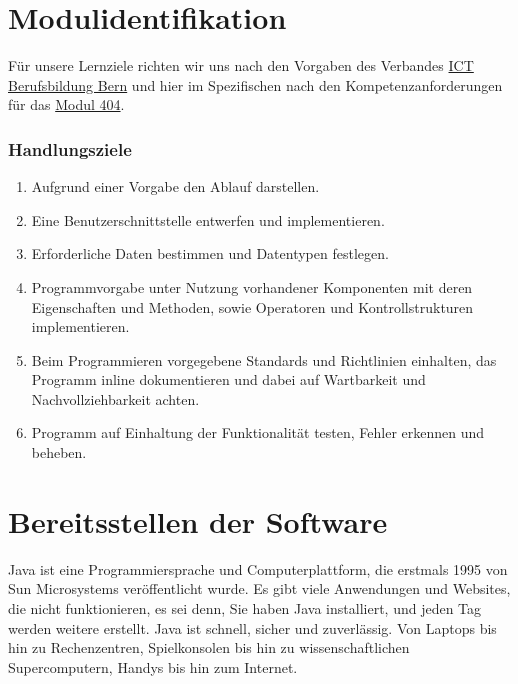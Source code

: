 \mode*




\section{Modulidentifikation}
\label{sec:identification}

Für unsere Lernziele richten wir uns nach den Vorgaben des Verbandes
\href{https://ict-berufsbildung-bern.ch}{ICT Berufsbildung Bern} und hier im Spezifischen
nach den Kompetenzanforderungen für das
\href{https://cf.ict-berufsbildung.ch/modules.php?name=Mbk&a=20101&cmodnr=404&noheader=1}
{Modul 404}.

\begin{frame}[fragile]
    \frametitle<presentation>{Handlungsziele}

    \begin{enumerate}
        \item Aufgrund einer Vorgabe den Ablauf darstellen.
        \item Eine Benutzerschnittstelle entwerfen und implementieren.
        \item Erforderliche Daten bestimmen und Datentypen festlegen.
        \item Programmvorgabe unter Nutzung vorhandener Komponenten mit deren Eigenschaften und Methoden, sowie
        Operatoren und Kontrollstrukturen implementieren.
        \item Beim Programmieren vorgegebene Standards und Richtlinien einhalten, das Programm inline dokumentieren und
        dabei auf Wartbarkeit und Nachvollziehbarkeit achten.
        \item Programm auf Einhaltung der Funktionalität testen, Fehler erkennen und beheben.
    \end{enumerate}

\end{frame}


\section{Bereitsstellen der Software}
\label{sec:java-technologie}

Java ist eine Programmiersprache und Computerplattform, die erstmals 1995 von
Sun Microsystems veröffentlicht wurde. Es gibt viele Anwendungen und
Websites, die nicht funktionieren, es sei denn, Sie haben Java installiert,
und jeden Tag werden weitere erstellt. Java ist schnell, sicher und
zuverlässig. Von Laptops bis hin zu Rechenzentren, Spielkonsolen bis hin zu
wissenschaftlichen Supercomputern, Handys bis hin zum Internet.


